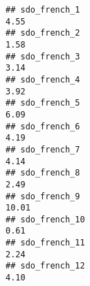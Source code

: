 \documentclass[
]{article}
\begin{document}
\begin{verbatim}
## sdo_french_1                                                                                                                                                                                                                   4.55
## sdo_french_2                                                                                                                                                                                                                   1.58
## sdo_french_3                                                                                                                                                                                                                   3.14
## sdo_french_4                                                                                                                                                                                                                   3.92
## sdo_french_5                                                                                                                                                                                                                   6.09
## sdo_french_6                                                                                                                                                                                                                   4.19
## sdo_french_7                                                                                                                                                                                                                   4.14
## sdo_french_8                                                                                                                                                                                                                   2.49
## sdo_french_9                                                                                                                                                                                                                  10.01
## sdo_french_10                                                                                                                                                                                                                  0.61
## sdo_french_11                                                                                                                                                                                                                  2.24
## sdo_french_12                                                                                                                                                                                                                  4.10

\end{verbatim}
\end{document}
